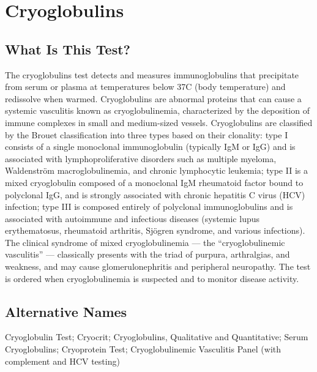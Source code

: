 \chapter{Cryoglobulins}

\section*{What Is This Test?}
The cryoglobulins test detects and measures immunoglobulins that precipitate from serum or plasma at temperatures below 37\textdegree{}C (body temperature) and redissolve when warmed. Cryoglobulins are abnormal proteins that can cause a systemic vasculitis known as cryoglobulinemia, characterized by the deposition of immune complexes in small and medium-sized vessels. Cryoglobulins are classified by the Brouet classification into three types based on their clonality: type I consists of a single monoclonal immunoglobulin (typically IgM or IgG) and is associated with lymphoproliferative disorders such as multiple myeloma, Waldenstr\"om macroglobulinemia, and chronic lymphocytic leukemia; type II is a mixed cryoglobulin composed of a monoclonal IgM rheumatoid factor bound to polyclonal IgG, and is strongly associated with chronic hepatitis C virus (HCV) infection; type III is composed entirely of polyclonal immunoglobulins and is associated with autoimmune and infectious diseases (systemic lupus erythematosus, rheumatoid arthritis, Sj\"ogren syndrome, and various infections). The clinical syndrome of mixed cryoglobulinemia --- the ``cryoglobulinemic vasculitis'' --- classically presents with the triad of purpura, arthralgias, and weakness, and may cause glomerulonephritis and peripheral neuropathy. The test is ordered when cryoglobulinemia is suspected and to monitor disease activity.

\section*{Alternative Names}
Cryoglobulin Test; Cryocrit; Cryoglobulins, Qualitative and Quantitative; Serum Cryoglobulins; Cryoprotein Test; Cryoglobulinemic Vasculitis Panel (with complement and HCV testing)

